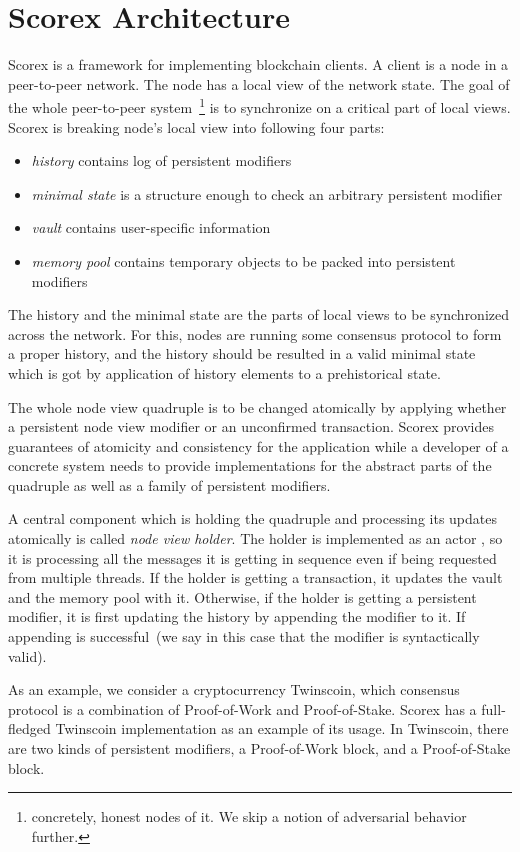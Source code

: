 
\section{Scorex Architecture}

Scorex is a framework for implementing blockchain clients. A client is a node in a peer-to-peer network. The node has a local view of the network state. The goal of the whole peer-to-peer system~\footnote{concretely, honest nodes of it. We skip a notion of adversarial behavior further.} is to synchronize on a critical part of local views. Scorex is breaking node's local view into following four parts: 

\begin{itemize}
\item{\em history} contains log of persistent modifiers
\item{\em minimal state} is a structure enough to check an arbitrary persistent modifier
\item{\em vault} contains user-specific information
\item{\em memory pool} contains temporary objects to be packed into persistent modifiers 
\end{itemize}

The history and the minimal state are the parts of local views to be synchronized across the network. For this, nodes are running some consensus protocol to form a proper history, and the history should be resulted in a valid minimal state which is got by application of history elements to a prehistorical state.

The whole node view quadruple is to be changed atomically by applying whether a persistent node view modifier or an unconfirmed transaction. Scorex provides guarantees of atomicity and consistency for the application while a developer of a concrete system needs to provide implementations for the abstract parts of the quadruple as well as a family of persistent modifiers.

A central component which is holding the quadruple {\em <history, minimal state, vault, memory pool>} and processing its updates atomically is called {\em node view holder}. The holder is implemented as an actor , so it is processing all the messages it is getting in sequence even if being requested from multiple threads. If the holder is getting a transaction, it updates the vault and the memory pool with it. Otherwise, if the holder is getting a persistent modifier, it is first updating the history by appending the modifier to it. If appending is successful~(we say in this case that the modifier is syntactically valid). 

As an example, we consider a cryptocurrency Twinscoin, which consensus protocol is a combination of Proof-of-Work and Proof-of-Stake. Scorex has a full-fledged Twinscoin implementation as an example of its usage. In Twinscoin, there are two kinds of persistent modifiers, a Proof-of-Work block, and a Proof-of-Stake block. 
